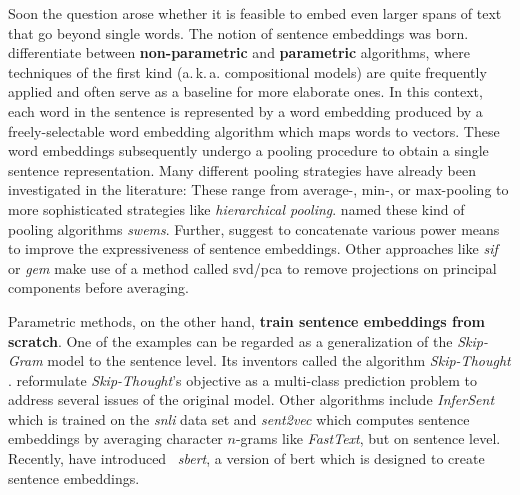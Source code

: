  Soon the question arose whether it is feasible to embed even larger spans of text that go beyond single words. The notion of sentence embeddings was born. \citep{Yang.2018} differentiate between \textbf{non-parametric} and \textbf{parametric} algorithms, where techniques of the first kind (a.\,k.\,a. compositional models) are quite frequently applied and often serve as a baseline for more elaborate ones. In this context, each word in the sentence is represented by a word embedding produced by a freely-selectable word embedding algorithm which maps words to vectors. These word embeddings subsequently undergo a pooling procedure to obtain a single sentence representation. Many different pooling strategies have already been investigated in the literature: These range from average-, min-, or max-pooling to more sophisticated strategies like \textit{hierarchical pooling}. \citep{Shen.2018} named these kind of pooling algorithms \textit{\glspl{swem}}. Further, \citep{Rueckle.2018} suggest to concatenate various power means to improve the expressiveness of sentence embeddings. Other approaches like \textit{\gls{sif}} \citep{Arora.2017} or \textit{\gls{gem}} \citep{Yang.2018} make use of a method called \gls{svd}/\gls{pca} to remove projections on principal components before averaging.

Parametric methods, on the other hand, \textbf{train sentence embeddings from scratch}. One of the examples can be regarded as a generalization of the \textit{Skip-Gram} model to the sentence level. Its inventors called the algorithm \textit{Skip-Thought} \citep{Kiros.2015}. \citep{Logeswaran.2018} reformulate \textit{Skip-Thought}'s objective as a multi-class prediction problem to address several issues of the original model. Other algorithms include \textit{InferSent} \citep{Conneau.2017} which is trained on the \textit{\gls{snli}} data set \citep{Bowman.2015} and \textit{sent2vec} \citep{Pagliardini.2018} which computes sentence embeddings by averaging character $n$-grams like \textit{FastText}, but on sentence level. Recently, \citep{Reimers.2019} have introduced \	\textit{\gls{sbert}}, a version of \gls{bert} which is designed to create sentence embeddings.

